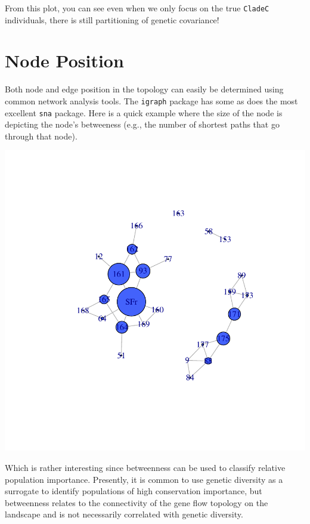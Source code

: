 \documentclass[letterpaper,twoside,openany]{book}
\begin{document}
From this plot, you can see even when we only focus on the true \texttt{CladeC} individuals, there is still partitioning of genetic covariance!  


\section{Node Position}

Both node and edge position in the topology can easily be determined using common network analysis tools.  The \texttt{igraph} package has some as does the most excellent \texttt{sna} package.  Here is a quick example where the size of the node is depicting the node's betweeness (e.g., the number of shortest paths that go through that node).

\begin{Schunk}
\end{Schunk}
\includegraphics{gstudio-067}

Which is rather interesting since betweenness can be used to classify relative population importance.  Presently, it is common to use genetic diversity as a surrogate to identify populations of high conservation importance, but betweenness relates to the connectivity of the gene flow topology on the landscape and is not necessarily correlated with genetic diversity.
\end{document}
